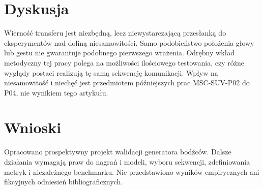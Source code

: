 \documentclass[11pt,a4paper]{article}
\begin{document}
\section{Dyskusja}
Wierność transferu jest niezbędną, lecz niewystarczającą przesłanką do eksperymentów nad doliną niesamowitości. Samo podobieństwo położenia głowy lub gestu nie gwarantuje podobnego pierwszego wrażenia. Odrębny wkład metodyczny tej pracy polega na możliwości ilościowego testowania, czy różne wyglądy postaci realizują tę samą sekwencję komunikacji. Wpływ na niesamowitość i niechęć jest przedmiotem późniejszych prac MSC-SUV-P02 do P04, nie wynikiem tego artykułu.
\section{Wnioski}
Opracowano prospektywny projekt walidacji generatora bodźców. Dalsze działania wymagają praw do nagrań i modeli, wyboru sekwencji, zdefiniowania metryk i niezależnego benchmarku. Nie przedstawiono wyników empirycznych ani fikcyjnych odniesień bibliograficznych.
\end{document}
